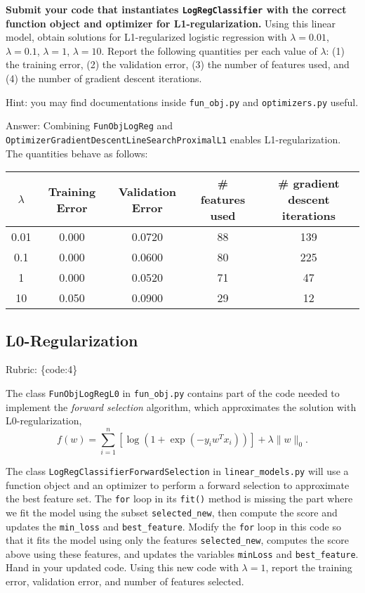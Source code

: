 \documentclass{article}
\def\ans#1{\par\gre{Answer: #1}}
\def\rubric#1{\gre{Rubric: \{#1\}}}{}
\def\blu#1{{\color{blu}#1}}
\def\gre#1{{\color{gre}#1}}
\def\norm#1{\|#1\|}
\begin{document}
\blu{\textbf{Submit your code that instantiates \texttt{LogRegClassifier} with the correct function object and optimizer for L1-regularization.} Using this linear model, obtain solutions for L1-regularized logistic regression with $\lambda = 0.01$, $\lambda = 0.1$, $\lambda = 1$, $\lambda = 10$. Report the following quantities per each value of $\lambda$: (1) the training error, (2) the validation error, (3) the number of features used, and (4) the number of gradient descent iterations.}

Hint: you may find documentations inside \texttt{fun\_obj.py} and \texttt{optimizers.py} useful.

\ans{
Combining \texttt{FunObjLogReg} and \texttt{OptimizerGradientDescentLineSearchProximalL1} enables L1-regularization. The quantities behave as follows: \\
\begin{tabular}{ccccc}
	$\lambda$ & Training Error & Validation Error & \# features used & \# gradient descent iterations \\
	\hline
	0.01      & 0.000          & 0.0720           & 88               & 139                            \\
	0.1       & 0.000          & 0.0600           & 80               & 225                            \\
	1         & 0.000          & 0.0520           & 71               & 47                            \\
	10        & 0.050          & 0.0900           & 29               & 12                            
\end{tabular}
}
\subsection{L0-Regularization}
\rubric{code:4}

The class \texttt{FunObjLogRegL0} in \texttt{fun\_obj.py} contains part of the code needed to implement the \emph{forward selection} algorithm,
which approximates the solution with L0-regularization,
\[
f(w) =  \sum_{i=1}^n \left[\log(1+\exp(-y_iw^Tx_i))\right] + \lambda\norm{w}_0.
\]

The class \texttt{LogRegClassifierForwardSelection} in \texttt{linear\_models.py} will use a function object and an optimizer to perform a forward selection to approximate the best feature set.
The \texttt{for} loop in its \texttt{fit()} method is missing the part where we fit the model using the subset \texttt{selected\_new},
then compute the score and updates the \texttt{min\_loss} and \texttt{best\_feature}.
Modify the \texttt{for} loop in this code so that it fits the model using only
the features \texttt{selected\_new}, computes the score above using these features,
and updates the variables \texttt{minLoss} and \texttt{best\_feature}.
\blu{Hand in your updated code. Using this new code with $\lambda=1$,
report the training error, validation error, and number of features selected.}
\end{document}
